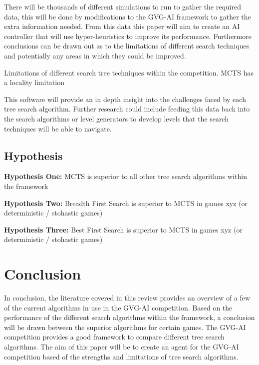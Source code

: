 \documentclass[journal]{IEEEtran}
\begin{document}
	There will be thousands of different simulations to run to gather the required data, this will be done by modifications to the GVG-AI framework to gather the extra information needed.
	From this data this paper will aim to create an AI controller that will use hyper-heuristics to improve its performance. Furthermore conclusions can be drawn out as to the limitations of different search techniques and potentially any areas in which they could be improved.
	
	Limitations of different search tree techniques within the competition.
	MCTS has a locality limitation 
	

	

	This software will provide an in depth insight into the challenges faced by each tree search algorithm.
	Further research could include feeding this data back into the search algorithms or level generators to develop levels that the search techniques will be able to navigate.


 
\subsection{Hypothesis}

	\textbf{Hypothesis One:}
		MCTS is superior to all other tree search algorithms within the framework
		
	\textbf{Hypothesis Two:}
		Breadth First Search is superior to MCTS in games xyz (or deterministic / stohastic games)

	\textbf{Hypothesis Three:}
		Best First Search is superior to MCTS in games xyz (or deterministic / stohastic games)

\section{Conclusion}
	In conclusion, the literature covered in this review provides an overview of a few of the current algorithms in use in the GVG-AI competition.
	Based on the performance of the different search algorithms within the framework, a conclusion will be drawn between the superior algorithms for certain games.
	The GVG-AI competition provides a good framework to compare different tree search algorithms. 
	The aim of this paper will be to create an agent for the GVG-AI competition based of the strengths and limitations of tree search algorithms.
\end{document}
